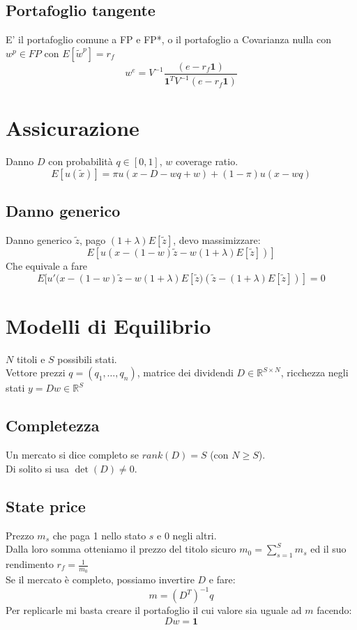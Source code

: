 \documentclass[a4paper,notitlepage]{report}%
\newcommand{\R}{\mathbb{R}}%
\begin{document}
\begin{multicols*}{2}
    \subsection*{Portafoglio tangente}
    E' il portafoglio comune a FP e FP*, o il portafoglio
    a Covarianza nulla con $w^p\in FP$ con $E[\tilde{w}^p] = r_f$
    \[
        w^e = V^{-1} \frac{(e-r_f\mathbf{1})}{\mathbf{1}^TV^{-1}(e-r_f\mathbf{1})}    
    \]



\section*{Assicurazione}

    Danno $D$ con probabilità $q\in[0,1]$, $w$ coverage ratio.
    \[
        E[u(\tilde{x})] = \pi u(x-D-wq+w) + (1-\pi) u(x-wq)   
    \]

    \subsection*{Danno generico}
    Danno generico $\tilde{z}$, pago $(1+\lambda)E[\tilde{z}]$, devo massimizzare:
    \[
        E[u( x - (1-w)\tilde{z} - w(1+\lambda)E[\tilde{z}] )]   
    \]
    Che equivale a fare
    \[
        E[ u'(x - (1-w)\tilde{z} - w(1+\lambda)E[\tilde{z} ) ( \tilde{z}-(1+\lambda) E[\tilde{z}] ) ] = 0
    \]


\section*{Modelli di Equilibrio}
    $N$ titoli e $S$ possibili stati. \\
    Vettore prezzi $q=(q_1,\dots,q_n)$,
    matrice dei dividendi $D\in\R^{S\times N}$,
    ricchezza negli stati $y=Dw\in\R^S$

    \subsection*{Completezza}
        Un mercato si dice completo se $rank(D)=S$ (con $N\geq S$).\\
        Di solito si usa $\det(D)\neq0$.

    \subsection*{State price}
    Prezzo $m_s$ che paga 1 nello stato $s$ e 0 negli altri.\\
    Dalla loro somma otteniamo il prezzo del titolo sicuro $m_0 = {\sum_{s=1}^S m_s}$
    ed il suo rendimento $r_f = \frac{1}{m_0}$\\
    Se il mercato è completo, possiamo invertire $D$ e fare:
    \[
        m=(D^T)^{-1} q   
    \]
    Per replicarle mi basta creare il portafoglio
    il cui valore sia uguale ad $m$ facendo:
    \[
        Dw=\mathbf{1}   
    \]


\end{multicols*}
\end{document}

